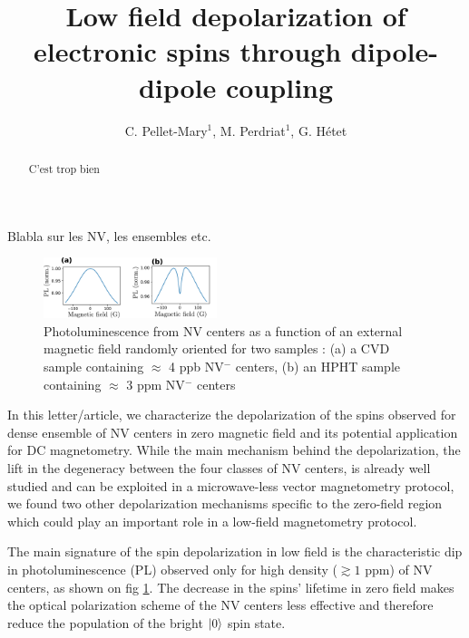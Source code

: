 \documentclass[preprintnumbers,amsmath,amssymb,superscriptaddress,twocolumn,showpacs]{revtex4-2}
\begin{document}
\title{Low field depolarization of electronic spins through dipole-dipole coupling}

\author{C. Pellet-Mary$^1$, M. Perdriat$^1$, G. H\'etet} 


\begin{abstract}
C'est trop bien
\end{abstract}

\maketitle
Blabla sur les NV, les ensembles etc.




\begin{figure}
\includegraphics[width=0.45\textwidth]{Figures/fig dense vs pas dense}
\caption{Photoluminescence from NV centers as a function of an external magnetic field randomly oriented for two samples : (a) a CVD sample containing $\approx$ 4 ppb NV$^-$ centers, (b) an HPHT sample containing $\approx$ 3 ppm NV$^-$ centers}
\label{PL_NV_density}
\end{figure}

In this letter/article, we characterize the depolarization of the spins observed for dense ensemble of NV centers in zero magnetic field and its potential application for DC magnetometry. While the main mechanism behind the depolarization, the lift in the degeneracy between the four classes of NV centers, is already well studied and can be exploited in a microwave-less vector magnetometry protocol, we found two other depolarization mechanisms specific to the zero-field region which could play an important role in a low-field magnetometry protocol.

The main signature of the spin depolarization in low field is the characteristic dip in photoluminescence (PL) observed only for high density ($\gtrsim 1$ ppm) of NV centers, as shown on fig \ref{PL_NV_density}. The decrease in the spins' lifetime in zero field makes the optical polarization scheme of the NV centers less effective and therefore reduce the population of the bright $\ket{0}$ spin state. %
\end{document}
